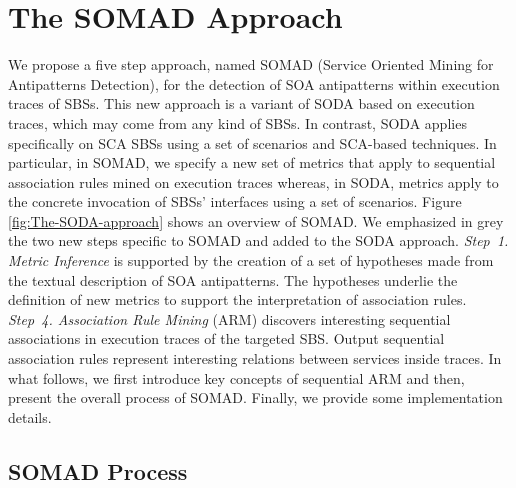 
\section{The SOMAD Approach \label{sec:Methodology}}



We propose a five step approach, named SOMAD (Service Oriented Mining for Antipatterns Detection), for the detection of SOA antipatterns within execution traces of SBSs. This new approach is a variant of SODA based on execution traces, which may come from any kind of SBSs. 
In contrast, SODA applies specifically on SCA SBSs using a set of scenarios and SCA-based techniques. In particular, in SOMAD, we specify a new set of metrics that apply to sequential association rules mined on execution traces whereas, in SODA, metrics apply to the concrete invocation of SBSs' interfaces using a set of scenarios. 
Figure \ref{fig:The-SODA-approach} shows an overview of SOMAD. We emphasized in grey the two new steps specific to SOMAD and added to the SODA approach. \textit{Step~1. Metric Inference} is supported by the creation of a set of hypotheses made from the textual description of SOA antipatterns. The hypotheses underlie the definition of new  metrics to support the interpretation of association rules. \textit{Step~4. Association Rule Mining} (ARM) discovers interesting sequential associations in execution traces of the targeted SBS.  Output sequential association rules represent  interesting relations between services inside traces. In what follows, we first introduce key concepts of sequential ARM and then, present the overall process of SOMAD. Finally, we provide some implementation details.




\subsection{SOMAD Process}












